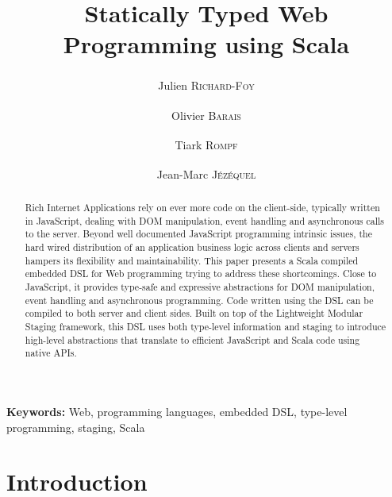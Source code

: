\documentclass[american,english,runningheads]{llncs}
\newcommand{\etal}{\emph{et al.~}}
\newcommand{\noun}[1]{\textsc{#1}}
\begin{document}
\setcounter{lstlisting}{0}
\renewcommand{\thelstlisting}{\arabic{lstlisting}}

\title{Statically Typed Web Programming using Scala}

\author{Julien \noun{Richard-Foy}\textsuperscript{\textasteriskcentered}\textsuperscript{\textdaggerdbl} \and Olivier
\noun{Barais}\textsuperscript{\textasteriskcentered} \and Tiark \noun{Rompf}\textsuperscript{\textdagger} \and
Jean-Marc \noun{Jézéquel}\textsuperscript{\textasteriskcentered}}

\authorrunning{Julien \noun{Richard-Foy} \etal{}}

\maketitle


\begin{abstract}
Rich Internet Applications rely on ever more code on the client-side, 
typically written in JavaScript, dealing
with DOM manipulation, event handling and asynchronous calls to the 
server. Beyond well documented JavaScript programming intrinsic issues,
the hard wired distribution of an application business logic across 
clients and servers hampers its flexibility and maintainability. This 
paper presents a Scala compiled
embedded DSL for Web programming trying to address these shortcomings. 
Close to JavaScript, it provides type-safe
and expressive abstractions for DOM manipulation, event handling and
asynchronous programming. Code written using the DSL can be compiled to both
server and client sides. Built on top of the Lightweight Modular Staging
framework, this DSL uses both type-level information and staging to  introduce
high-level abstractions that translate to efficient JavaScript and Scala 
code using native APIs.
\end{abstract}

{\bf Keywords:} Web, programming languages, embedded DSL, type-level programming, staging, Scala

\section{Introduction}
\end{document}
